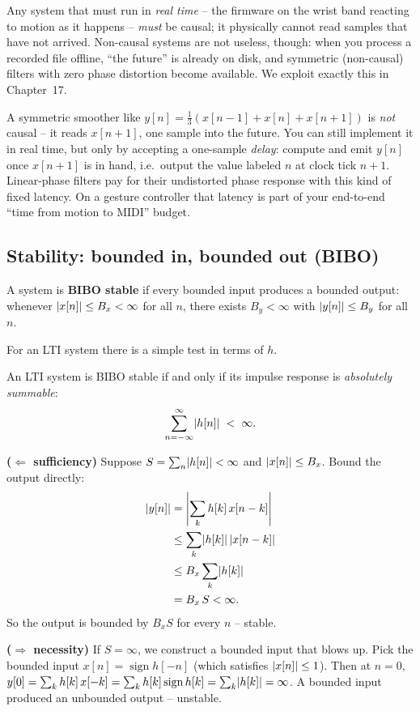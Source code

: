 Any system that must run in \emph{real time} -- the firmware on the wrist
band reacting to motion as it happens -- \emph{must} be causal; it physically
cannot read samples that have not arrived. Non-causal systems are not useless,
though: when you process a recorded file offline, ``the future'' is already on
disk, and symmetric (non-causal) filters with zero phase distortion become
available. We exploit exactly this in Chapter~17.

\begin{trapbox}
A symmetric smoother like $y[n]=\tfrac13(x[n-1]+x[n]+x[n+1])$ is \emph{not}
causal -- it reads $x[n+1]$, one sample into the future. You can still implement
it in real time, but only by accepting a one-sample \emph{delay}: compute and
emit $y[n]$ once $x[n+1]$ is in hand, i.e.\ output the value labeled $n$ at clock
tick $n{+}1$. Linear-phase filters pay for their undistorted phase response with
this kind of fixed latency. On a gesture controller that latency is part of your
end-to-end ``time from motion to MIDI'' budget.
\end{trapbox}

\subsection*{Stability: bounded in, bounded out (BIBO)}

\begin{definition}
\label{ch12:def-bibo}
A system is \textbf{BIBO stable} if every bounded input produces a bounded
output: whenever $\lvert x[n]\rvert\le B_x<\infty$ for all $n$, there exists
$B_y<\infty$ with $\lvert y[n]\rvert\le B_y$ for all $n$.
\end{definition}

For an LTI system there is a simple test in terms of $h$.

\begin{theorem}
\label{ch12:thm-bibo}
An LTI system is BIBO stable if and only if its impulse response is
\emph{absolutely summable}:
\[
  \sum_{n=-\infty}^{\infty} \lvert h[n]\rvert \;<\; \infty.
\]
\end{theorem}

\begin{whybox}
\textbf{($\Leftarrow$ sufficiency)} Suppose $S=\sum_n\lvert h[n]\rvert<\infty$ and
$\lvert x[n]\rvert\le B_x$. Bound the output directly:
\begin{align*}
  \lvert y[n]\rvert &= \left|\sum_k h[k]\,x[n-k]\right| \\
  &\le \sum_k \lvert h[k]\rvert\,\lvert x[n-k]\rvert \\
  &\le B_x \sum_k \lvert h[k]\rvert \\
  &= B_x\,S < \infty.
\end{align*}
So the output is bounded by $B_x S$ for every $n$ -- stable.

\textbf{($\Rightarrow$ necessity)} If $S=\infty$, we construct a bounded input
that blows up. Pick the bounded input $x[n] = \operatorname{sign} h[-n]$ (which
satisfies $\lvert x[n]\rvert\le1$). Then at $n=0$,
$y[0]=\sum_k h[k]\,x[-k]=\sum_k h[k]\operatorname{sign}h[k]=\sum_k\lvert h[k]\rvert=
\infty$. A bounded input produced an unbounded output -- unstable.
\end{whybox}

